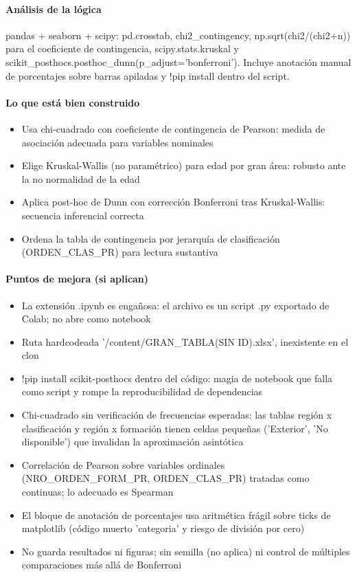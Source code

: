 \paragraph{Análisis de la lógica}
pandas + seaborn + scipy: pd.crosstab, chi2\_contingency, np.sqrt(chi2/(chi2+n)) para el coeficiente de contingencia, scipy.stats.kruskal y scikit\_posthocs.posthoc\_dunn(p\_adjust='bonferroni'). Incluye anotación manual de porcentajes sobre barras apiladas y !pip install dentro del script.

\paragraph{Lo que está bien construido}
\begin{itemize}
  \item Usa chi-cuadrado con coeficiente de contingencia de Pearson: medida de asociación adecuada para variables nominales
  \item Elige Kruskal-Wallis (no paramétrico) para edad por gran área: robusto ante la no normalidad de la edad
  \item Aplica post-hoc de Dunn con corrección Bonferroni tras Kruskal-Wallis: secuencia inferencial correcta
  \item Ordena la tabla de contingencia por jerarquía de clasificación (ORDEN\_CLAS\_PR) para lectura sustantiva
\end{itemize}

\paragraph{Puntos de mejora (si aplican)}
\begin{itemize}
  \item La extensión .ipynb es engañosa: el archivo es un script .py exportado de Colab; no abre como notebook
  \item Ruta hardcodeada '/content/GRAN\_TABLA(SIN ID).xlsx', inexistente en el clon
  \item !pip install scikit-posthocs dentro del código: magia de notebook que falla como script y rompe la reproducibilidad de dependencias
  \item Chi-cuadrado sin verificación de frecuencias esperadas: las tablas región x clasificación y región x formación tienen celdas pequeñas ('Exterior', 'No disponible') que invalidan la aproximación asintótica
  \item Correlación de Pearson sobre variables ordinales (NRO\_ORDEN\_FORM\_PR, ORDEN\_CLAS\_PR) tratadas como continuas; lo adecuado es Spearman
  \item El bloque de anotación de porcentajes usa aritmética frágil sobre ticks de matplotlib (código muerto 'categoria' y riesgo de división por cero)
  \item No guarda resultados ni figuras; sin semilla (no aplica) ni control de múltiples comparaciones más allá de Bonferroni
\end{itemize}

